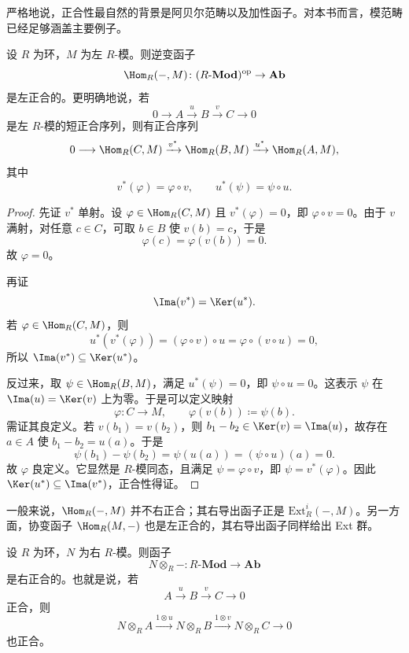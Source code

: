 \begin{remark}
严格地说，正合性最自然的背景是阿贝尔范畴以及加性函子。对本书而言，模范畴已经足够涵盖主要例子。
\end{remark}

\begin{proposition}
设 $R$ 为环，$M$ 为左 $R$-模。则逆变函子
\[
  \Hom_R(-,M)\colon (R\text{-}\mathbf{Mod})^{\mathrm{op}}\to \mathbf{Ab}
\]
是左正合的。更明确地说，若
\[
  0\longrightarrow A\xrightarrow{u} B\xrightarrow{v} C\longrightarrow 0
\]
是左 $R$-模的短正合序列，则有正合序列
\[
  0\longrightarrow \Hom_R(C,M)
  \xrightarrow{v^{\ast}} \Hom_R(B,M)
  \xrightarrow{u^{\ast}} \Hom_R(A,M),
\]
其中
\[
  v^{\ast}(\varphi)=\varphi\circ v,
  \qquad
  u^{\ast}(\psi)=\psi\circ u.
\]
\end{proposition}

\begin{proof}
先证 $v^{\ast}$ 单射。设 $\varphi\in \Hom_R(C,M)$ 且 $v^{\ast}(\varphi)=0$，即 $\varphi\circ v=0$。由于 $v$ 满射，对任意 $c\in C$，可取 $b\in B$ 使 $v(b)=c$，于是
\[
  \varphi(c)=\varphi(v(b))=0.
\]
故 $\varphi=0$。

再证
\[
  \Ima(v^{\ast})=\Ker(u^{\ast}).
\]
若 $\varphi\in \Hom_R(C,M)$，则
\[
  u^{\ast}(v^{\ast}(\varphi))=(\varphi\circ v)\circ u=
  \varphi\circ (v\circ u)=0,
\]
所以 $\Ima(v^{\ast})\subseteq \Ker(u^{\ast})$。

反过来，取 $\psi\in \Hom_R(B,M)$，满足 $u^{\ast}(\psi)=0$，即 $\psi\circ u=0$。这表示 $\psi$ 在 $\Ima(u)=\Ker(v)$ 上为零。于是可以定义映射
\[
  \varphi\colon C\to M,
  \qquad
  \varphi(v(b))\coloneqq \psi(b).
\]
需证其良定义。若 $v(b_1)=v(b_2)$，则 $b_1-b_2\in \Ker(v)=\Ima(u)$，故存在 $a\in A$ 使 $b_1-b_2=u(a)$。于是
\[
  \psi(b_1)-\psi(b_2)=\psi(u(a))=(\psi\circ u)(a)=0.
\]
故 $\varphi$ 良定义。它显然是 $R$-模同态，且满足 $\psi=\varphi\circ v$，即 $\psi=v^{\ast}(\varphi)$。因此 $\Ker(u^{\ast})\subseteq \Ima(v^{\ast})$，正合性得证。
\end{proof}

\begin{remark}
一般来说，$\Hom_R(-,M)$ 并不右正合；其右导出函子正是 $\mathrm{Ext}_R^i(-,M)$。另一方面，协变函子 $\Hom_R(M,-)$ 也是左正合的，其右导出函子同样给出 Ext 群。
\end{remark}

\begin{proposition}[张量积的右正合性]
设 $R$ 为环，$N$ 为右 $R$-模。则函子
\[
  N\otimes_R -\colon R\text{-}\mathbf{Mod}\to \mathbf{Ab}
\]
是右正合的。也就是说，若
\[
  A\xrightarrow{u} B\xrightarrow{v} C\longrightarrow 0
\]
正合，则
\[
  N\otimes_R A\xrightarrow{1\otimes u} N\otimes_R B\xrightarrow{1\otimes v} N\otimes_R C\longrightarrow 0
\]
也正合。
\end{proposition}

